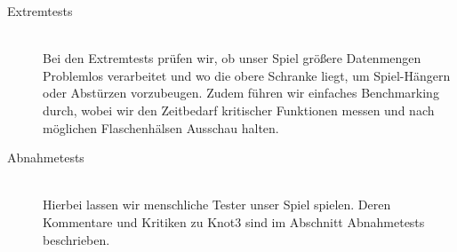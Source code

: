 \begin{description}
	
	\item[Extremtests] \hfill
	\\
	
	Bei den Extremtests prüfen wir, ob unser Spiel  größere Datenmengen Problemlos verarbeitet und wo die obere Schranke liegt, um Spiel-Hängern oder Abstürzen vorzubeugen. Zudem führen wir einfaches Benchmarking durch, wobei wir den Zeitbedarf kritischer Funktionen messen und nach möglichen Flaschenhälsen Ausschau halten.


	\item[Abnahmetests] \hfill
	\\
	
	Hierbei lassen wir menschliche Tester unser Spiel spielen. Deren Kommentare und Kritiken zu Knot3 sind im Abschnitt Abnahmetests beschrieben.
		
\end{description}







